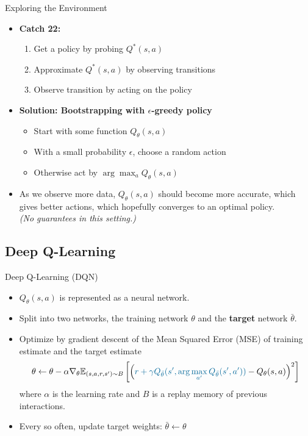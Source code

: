 \documentclass[aspectratio=1609,ADDITIONAL_DOCCLASS_ARGS]{beamer}
\newcommand{\tcolorbf}[2]{\textbf{\textcolor{#1}{#2}}}
\newcommand{\mcolor}[2]{\textcolor{#1}{#2}}
\begin{document}
\begin{frame}{Exploring the Environment}
  \begin{itemize}
  \setlength\itemsep{2mm}
  \item<1-> \textbf{Catch 22:}
        \begin{enumerate}
        \setlength\itemsep{2mm}
        \item<2-> Get a policy by probing $Q^*(s,a)$
        \item<3-> Approximate $Q^*(s,a)$ by observing transitions
        \item<4-> Observe transition by acting on the policy
        \end{enumerate}
  \item<5-> \textbf{Solution: Bootstrapping with $\epsilon$-greedy policy}
        \begin{itemize}
        \setlength\itemsep{2mm}
        \item<6-> Start with some function $Q_\theta(s,a)$
        \item<7-> With a small probability $\epsilon$, choose a random action
        \item<8-> Otherwise act by $\arg\max_a Q_\theta(s,a)$
        \end{itemize}
  \item<9-> As we observe more data, $Q_\theta(s,a)$ should become more accurate,
        which gives better actions, which hopefully converges to an optimal
        policy.\\[1mm]\emph{\small(No guarantees in this setting.)}
  \end{itemize}
\end{frame}

\subsection{Deep Q-Learning}

\begin{frame}{Deep Q-Learning (DQN)}
  \begin{itemize}
  \setlength\itemsep{2mm}
  \item<1-> $Q_\theta(s, a)$ is represented as a neural network.
  \item<2-> Split into two networks, the training network $\theta$ and the
        \tcolorbf{mathcolor1}{target} network $\bar{\theta}$.
  \item<3-> Optimize by gradient descent of the Mean Squared Error (MSE) of
        training estimate and the target estimate
        \begin{equation}
        \theta \leftarrow \theta -
        \alpha \nabla_\theta \mathbb{E}_{(s,a,r,s') \sim B}\left[\left(
          \mcolor{mathcolor1}{r + \gamma Q_{\bar{\theta}}(s', \arg\max_{a'} Q_{\bar{\theta}}(s', a'))}
          - Q_\theta(s,a)
        \right)^2\right]
        \end{equation}
        where $\alpha$ is the learning rate and $B$ is a replay memory of
        previous interactions.
  \item<4-> Every so often, update target weights: $\bar{\theta} \leftarrow \theta$
  \end{itemize}
\end{frame}
\end{document}
